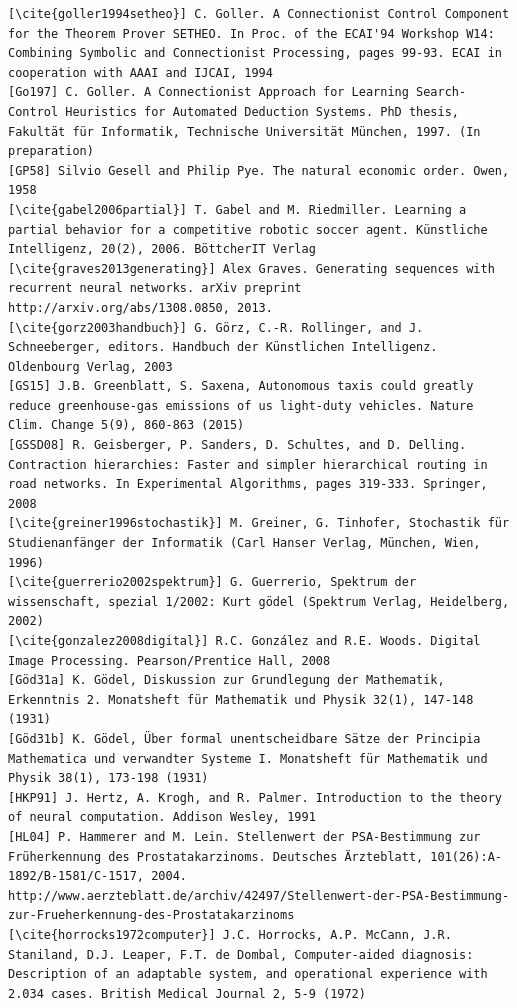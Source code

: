 \documentclass[10pt]{article}
\begin{document}
\begin{verbatim}
[\cite{goller1994setheo}] C. Goller. A Connectionist Control Component for the Theorem Prover SETHEO. In Proc. of the ECAI'94 Workshop W14: Combining Symbolic and Connectionist Processing, pages 99-93. ECAI in cooperation with AAAI and IJCAI, 1994
[Go197] C. Goller. A Connectionist Approach for Learning Search-Control Heuristics for Automated Deduction Systems. PhD thesis, Fakultät für Informatik, Technische Universität München, 1997. (In preparation)
[GP58] Silvio Gesell and Philip Pye. The natural economic order. Owen, 1958
[\cite{gabel2006partial}] T. Gabel and M. Riedmiller. Learning a partial behavior for a competitive robotic soccer agent. Künstliche Intelligenz, 20(2), 2006. BöttcherIT Verlag
[\cite{graves2013generating}] Alex Graves. Generating sequences with recurrent neural networks. arXiv preprint http://arxiv.org/abs/1308.0850, 2013.
[\cite{gorz2003handbuch}] G. Görz, C.-R. Rollinger, and J. Schneeberger, editors. Handbuch der Künstlichen Intelligenz. Oldenbourg Verlag, 2003
[GS15] J.B. Greenblatt, S. Saxena, Autonomous taxis could greatly reduce greenhouse-gas emissions of us light-duty vehicles. Nature Clim. Change 5(9), 860-863 (2015)
[GSSD08] R. Geisberger, P. Sanders, D. Schultes, and D. Delling. Contraction hierarchies: Faster and simpler hierarchical routing in road networks. In Experimental Algorithms, pages 319-333. Springer, 2008
[\cite{greiner1996stochastik}] M. Greiner, G. Tinhofer, Stochastik für Studienanfänger der Informatik (Carl Hanser Verlag, München, Wien, 1996)
[\cite{guerrerio2002spektrum}] G. Guerrerio, Spektrum der wissenschaft, spezial 1/2002: Kurt gödel (Spektrum Verlag, Heidelberg, 2002)
[\cite{gonzalez2008digital}] R.C. González and R.E. Woods. Digital Image Processing. Pearson/Prentice Hall, 2008
[Göd31a] K. Gödel, Diskussion zur Grundlegung der Mathematik, Erkenntnis 2. Monatsheft für Mathematik und Physik 32(1), 147-148 (1931)
[Göd31b] K. Gödel, Über formal unentscheidbare Sätze der Principia Mathematica und verwandter Systeme I. Monatsheft für Mathematik und Physik 38(1), 173-198 (1931)
[HKP91] J. Hertz, A. Krogh, and R. Palmer. Introduction to the theory of neural computation. Addison Wesley, 1991
[HL04] P. Hammerer and M. Lein. Stellenwert der PSA-Bestimmung zur Früherkennung des Prostatakarzinoms. Deutsches Ärzteblatt, 101(26):A-1892/B-1581/C-1517, 2004. http://www.aerzteblatt.de/archiv/42497/Stellenwert-der-PSA-Bestimmung-zur-Frueherkennung-des-Prostatakarzinoms
[\cite{horrocks1972computer}] J.C. Horrocks, A.P. McCann, J.R. Staniland, D.J. Leaper, F.T. de Dombal, Computer-aided diagnosis: Description of an adaptable system, and operational experience with 2.034 cases. British Medical Journal 2, 5-9 (1972)

\end{verbatim}
\end{document}
